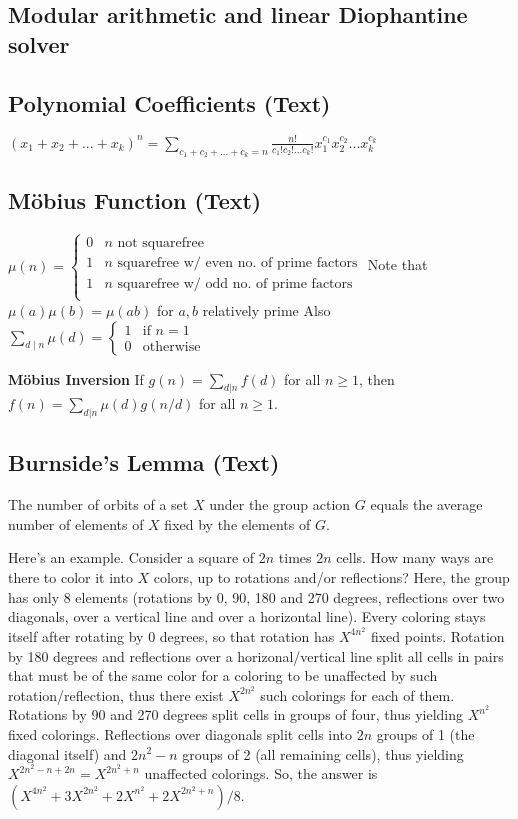 \documentclass[9pt]{extarticle}
\begin{document}
\begin{multicols*}{3}
\subsection{Modular arithmetic and linear Diophantine solver} %


\subsection{Polynomial Coefficients (Text)} %
$(x_1 + x_2 + ... + x_k)^n = \sum_{c_1 + c_2 + ... + c_k = n}
\frac{n!}{c_1! c_2! ... c_k!} x_1^{c_1} x_2^{c_2} ... x_k^{c_k}$

\subsection{M\"obius Function (Text)} %
$\mu(n) = \begin{cases}
0 & \text{$n$ not squarefree} \\
1 & \text{$n$ squarefree w/ even no. of prime factors} \\
1 & \text{$n$ squarefree w/ odd no. of prime factors} \\
\end{cases}$
Note that $\mu(a) \mu(b) = \mu(ab)$ for $a, b$ relatively prime
Also $\sum_{d \mid n} \mu(d) = \begin{cases} 1 & \text{if $n = 1$} \\
0 & \text{otherwise} \end{cases}$

\textbf{M\"obius Inversion}
If $g(n) = \sum_{d|n} f(d)$ for all $n \ge 1$, then
$f(n) = \sum_{d|n} \mu(d)g(n/d)$ for all $n \ge 1$.


\subsection{Burnside's Lemma (Text)} %
The number of orbits of a set $X$ under the group action $G$ equals the average
number of elements of $X$ fixed by the elements of $G$.

Here's an example. Consider a square of $2n$ times $2n$ cells. How many ways
are there to color it into $X$ colors, up to rotations and/or reflections?
Here, the group has only 8 elements (rotations by 0, 90, 180 and 270 degrees,
reflections over two diagonals, over a vertical line and over a horizontal
line). Every coloring stays itself after rotating by 0 degrees, so that
rotation has $X^{4n^2}$ fixed points. Rotation by 180 degrees and reflections
over a horizonal/vertical line split all cells in pairs that must be of the
same color for a coloring to be unaffected by such rotation/reflection, thus
there exist $X^{2n^2}$ such colorings for each of them. Rotations by 90 and 270
degrees split cells in groups of four, thus yielding $X^{n^2}$ fixed colorings.
Reflections over diagonals split cells into $2n$ groups of 1 (the diagonal
itself) and $2n^2-n$ groups of 2 (all remaining cells), thus yielding
$X^{2n^2-n+2n}=X^{2n^2+n}$ unaffected colorings.  So, the answer is
$(X^{4n^2}+3X^{2n^2}+2X^{n^2}+2X^{2n^2+n})/8$.


\end{multicols*}
\end{document}
